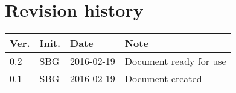 \chapter*{Revision history}
\label{app:rev_his}


\begin{tabular}{b{1cm} b{1cm} b{2cm} b{8cm}}
    \textbf{Ver.} & \textbf{Init.} & \textbf{Date} & \textbf{Note} \\
    \hline
    0.2 & SBG & 2016-02-19 & Document ready for use \\
    0.1 & SBG & 2016-02-19 & Document created \\
\end{tabular}
